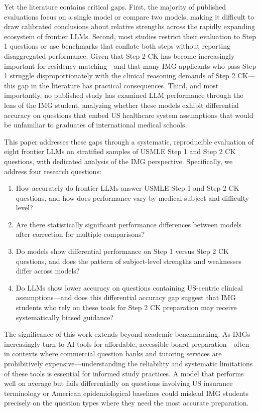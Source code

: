 Yet the literature contains critical gaps. First, the majority of published evaluations focus on a single model or compare two models, making it difficult to draw calibrated conclusions about relative strengths across the rapidly expanding ecosystem of frontier LLMs. Second, most studies restrict their evaluation to Step 1 questions or use benchmarks that conflate both steps without reporting disaggregated performance. Given that Step 2 CK has become increasingly important for residency matching—and that many IMG applicants who pass Step 1 struggle disproportionately with the clinical reasoning demands of Step 2 CK—this gap in the literature has practical consequences. Third, and most importantly, no published study has examined LLM performance through the lens of the IMG student, analyzing whether these models exhibit differential accuracy on questions that embed US healthcare system assumptions that would be unfamiliar to graduates of international medical schools.

This paper addresses these gaps through a systematic, reproducible evaluation of eight frontier LLMs on stratified samples of USMLE Step 1 and Step 2 CK questions, with dedicated analysis of the IMG perspective. Specifically, we address four research questions:

\begin{enumerate}
    \item How accurately do frontier LLMs answer USMLE Step 1 and Step 2 CK questions, and how does performance vary by medical subject and difficulty level?
    \item Are there statistically significant performance differences between models after correction for multiple comparisons?
    \item Do models show differential performance on Step 1 versus Step 2 CK questions, and does the pattern of subject-level strengths and weaknesses differ across models?
    \item Do LLMs show lower accuracy on questions containing US-centric clinical assumptions—and does this differential accuracy gap suggest that IMG students who rely on these tools for Step 2 CK preparation may receive systematically biased guidance?
\end{enumerate}

The significance of this work extends beyond academic benchmarking. As IMGs increasingly turn to AI tools for affordable, accessible board preparation—often in contexts where commercial question banks and tutoring services are prohibitively expensive—understanding the reliability and systematic limitations of these tools is essential for informed study practices. A model that performs well on average but fails differentially on questions involving US insurance terminology or American epidemiological baselines could mislead IMG students precisely on the question types where they need the most accurate preparation.

